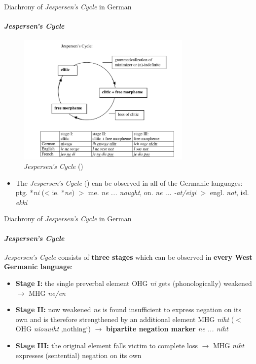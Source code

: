 \documentclass[xcolor=table, compress, %
handout
]{beamer}
\begin{document}
\begin{frame}{Diachrony of \textit{Jespersen's Cycle} in German}
\framesubtitle{\textit{Jespersen's Cycle}}

\begin{figure}[h]
\centering
\includegraphics[width=8.5cm]{Jespersen.png}
\caption{\textit{Jespersen's Cycle} (\citet[15]{jaeger08})}
\end{figure}
\begin{itemize}
    \item The \textit{Jespersen's Cycle} (\citealt{jespersen17}) can be observed in all of the Germanic languages: ptg. *\textit{ni} (< ie. *\textit{ne}) $>$ me. \textit{ne ... nought}, on. \textit{ne ... -at/eigi} $>$ engl. \textit{not}, isl. \textit{ekki}
\end{itemize}

\end{frame}

\begin{frame}{Diachrony of \textit{Jespersen's Cycle} in German}
\framesubtitle{\textit{Jespersen's Cycle}}
\textit{Jespersen's Cycle} consists of \textbf{three stages} which can be observed in \textbf{every West Germanic language}:

\begin{itemize}
    \item \textbf{Stage I:} the single preverbal element OHG \textit{ni} gets (phonologically) weakened $\rightarrow$ MHG \textit{ne/en}
    \item \textbf{Stage II:} now weakened \textit{ne} is found insufficient to express negation on its own and is therefore strengthened by an additional element MHG \textit{niht} ($<$ OHG \textit{niouuiht} ‚nothing‘) $\rightarrow$ \textbf{bipartite negation marker} \textit{ne ... niht}
    \item \textbf{Stage III:} the original element falls victim to complete loss $\rightarrow$ MHG \textit{niht} expresses (sentential) negation on its own
\end{itemize}

\end{frame}
\end{document}
